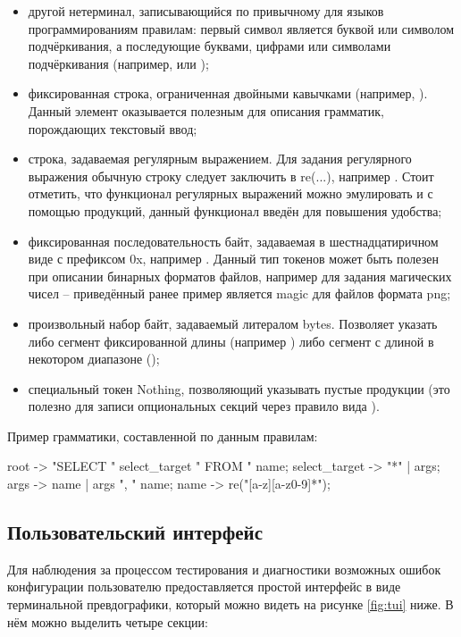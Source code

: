 \begin{itemize}
	\item другой нетерминал, записывающийся по привычному для языков программированиям правилам: первый символ является буквой или символом подчёркивания, а последующие буквами, цифрами или символами подчёркивания (например,  или );
	
	\item фиксированная строка, ограниченная двойными кавычками (например, ). Данный элемент оказывается полезным для описания грамматик, порождающих текстовый ввод;
	
	\item строка, задаваемая регулярным выражением. Для задания регулярного выражения обычную строку следует заключить в re(...), например . Стоит отметить, что функционал регулярных выражений можно эмулировать и с помощью продукций, данный функционал введён для повышения удобства;
	
	\item фиксированная последовательность байт, задаваемая в шестнадцатиричном виде с префиксом 0x, например . Данный тип токенов может быть полезен при описании бинарных форматов файлов, например для задания магических чисел -- приведённый ранее пример является magic для файлов формата png;
	
	\item произвольный набор байт, задаваемый литералом bytes. Позволяет указать либо сегмент фиксированной длины (например ) либо сегмент с длиной в некотором диапазоне ();
	
	\item специальный токен Nothing, позволяющий указывать пустые продукции (это полезно для записи опциональных секций через правило вида ).
\end{itemize}

Пример грамматики, составленной по данным правилам:
\begin{code}
root -> "SELECT " select_target " FROM " name;
select_target -> "*" | args;
args -> name | args ", " name;
name -> re("[a-z][a-z0-9]*");
\end{code}

\subsection{Пользовательский интерфейс}

Для наблюдения за процессом тестирования и диагностики возможных ошибок конфигурации пользователю предоставляется простой интерфейс в виде терминальной превдографики, который можно видеть на рисунке \ref{fig:tui} ниже. В нём можно выделить четыре секции:

